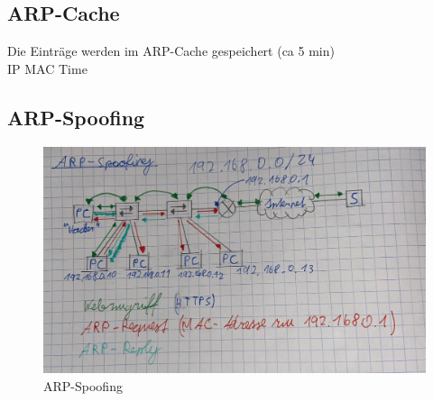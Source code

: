 \subsection*{ARP-Cache}
Die Einträge werden im ARP-Cache gespeichert (ca 5 min) \\
IP MAC Time

\subsection*{ARP-Spoofing}
\begin{figure}[H]
	\centering
	\includegraphics[width=1.0\linewidth]{figures/arpspoofing.jpeg}
	\caption{ARP-Spoofing}
\end{figure}





